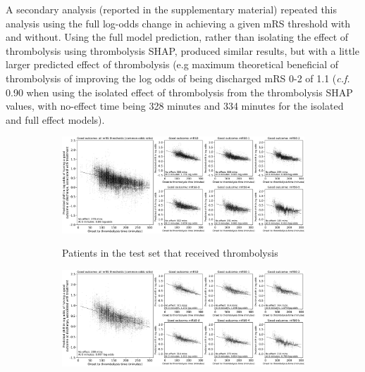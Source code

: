 A secondary analysis (reported in the supplementary material) repeated this analysis using the full log-odds change in achieving a given mRS threshold with and without. Using the full model prediction, rather than isolating the effect of thrombolysis using thrombolysis SHAP, produced similar results, but with a little larger predicted effect of thrombolysis (e.g  maximum theoretical beneficial of thrombolysis of improving the log odds of being discharged mRS 0-2 of 1.1 (\textit{c.f.} 0.90 when using the isolated effect of thrombolysis from the thrombolysis SHAP values, with no-effect time being 328 minutes and 334 minutes for the isolated and full effect models).

\begin{figure}[!ht]
    \centering
    \begin{subfigure}[b]{1\textwidth}
      \centering
      \includegraphics[width=1\textwidth]{./images/103_xgb_7_features_1fold_binary_improvement_logodds_bymRSthreshold_sns_subplots_nLVO_LVO_ivt_shap_paper}\\
      \caption{Patients in the test set that received thrombolysis}
      \label{fig:shap_shift_lvo_nlvo}
    \end{subfigure}
    \hfill
    \begin{subfigure}[b]{1\textwidth}
      \centering    
      \includegraphics[width=1\textwidth]{./images/103_xgb_7_features_1fold_binary_improvement_logodds_bymRSthreshold_sns_subplots_LVO_ivt_shap_paper}\\

\end{subfigure}
\end{figure}

